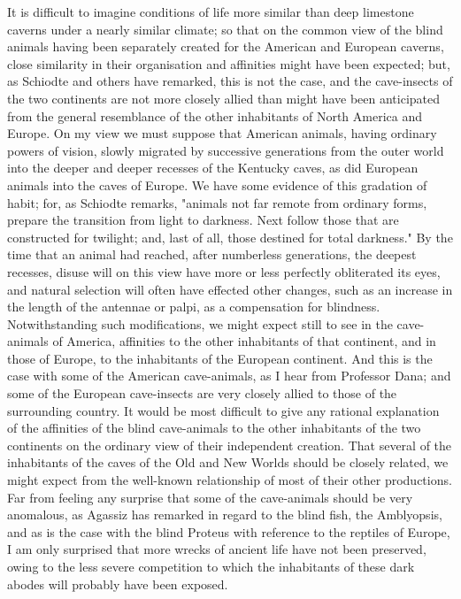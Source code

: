 It is difficult to imagine conditions of life more similar than deep limestone caverns under a nearly similar climate; so that on the common view of the blind animals having been separately created for the American and European caverns, close similarity in their organisation and affinities might have been expected; but, as Schiodte and others have remarked, this is not the case, and the cave-insects of the two continents are not more closely allied than might have been anticipated from the general resemblance of the other inhabitants of North America and Europe. On my view we must suppose that American animals, having ordinary powers of vision, slowly migrated by successive generations from the outer world into the deeper and deeper recesses of the Kentucky caves, as did European animals into the caves of Europe. We have some evidence of this gradation of habit; for, as Schiodte remarks, "animals not far remote from ordinary forms, prepare the transition from light to darkness. Next follow those that are constructed for twilight; and, last of all, those destined for total darkness." By the time that an animal had reached, after numberless generations, the deepest recesses, disuse will on this view have more or less perfectly obliterated its eyes, and natural selection will often have effected other changes, such as an increase in the length of the antennae or palpi, as a compensation for blindness. Notwithstanding such modifications, we might expect still to see in the cave-animals of America, affinities to the other inhabitants of that continent, and in those of Europe, to the inhabitants of the European continent. And this is the case with some of the American cave-animals, as I hear from Professor Dana; and some of the European cave-insects are very closely allied to those of the surrounding country. It would be most difficult to give any rational explanation of the affinities of the blind cave-animals to the other inhabitants of the two continents on the ordinary view of their independent creation. That several of the inhabitants of the caves of the Old and New Worlds should be closely related, we might expect from the well-known relationship of most of their other productions. Far from feeling any surprise that some of the cave-animals should be very anomalous, as Agassiz has remarked in regard to the blind fish, the Amblyopsis, and as is the case with the blind Proteus with reference to the reptiles of Europe, I am only surprised that more wrecks of ancient life have not been preserved, owing to the less severe competition to which the inhabitants of these dark abodes will probably have been exposed.

